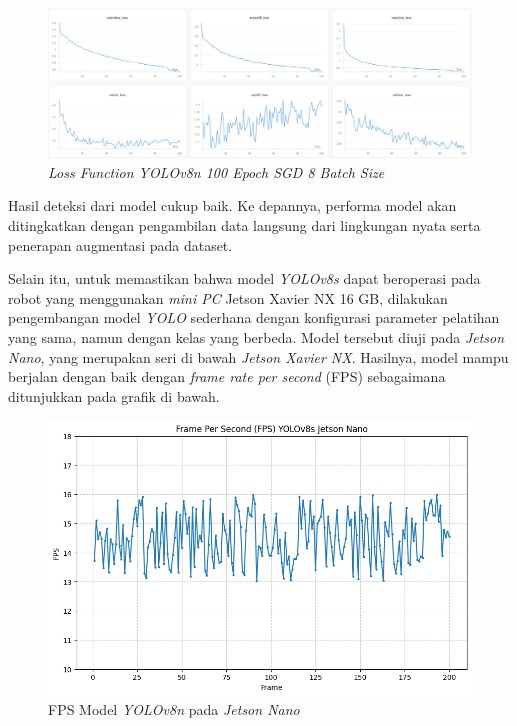 \begin{figure}[H] 
    \centering
    \includegraphics[scale=0.3]{gambar/lost_function.png}
    \caption{\emph{Loss Function YOLOv8n 100 Epoch SGD 8 Batch Size}}
    \label{fig:loss_function}
\end{figure}

Hasil deteksi dari model cukup baik. Ke depannya, performa model akan ditingkatkan dengan pengambilan data langsung dari lingkungan nyata serta penerapan augmentasi pada dataset.

Selain itu, untuk memastikan bahwa model \emph{YOLOv8s} dapat beroperasi pada robot yang menggunakan \emph{mini PC} Jetson Xavier NX 16 GB, dilakukan pengembangan model \emph{YOLO} sederhana dengan konfigurasi parameter pelatihan yang sama, namun dengan kelas yang berbeda. Model tersebut diuji pada \emph{Jetson Nano}, yang merupakan seri di bawah \emph{Jetson Xavier NX}. Hasilnya, model mampu berjalan dengan baik dengan \emph{frame rate per second} (FPS) sebagaimana ditunjukkan pada grafik di bawah.

\begin{figure}[H] 
    \centering
    \includegraphics[scale=0.5]{gambar/fps.png}
    \caption{FPS Model \emph{YOLOv8n} pada \emph{Jetson Nano}}
    \label{fig:FPS Model YOLOv8s pada Jetson Nano}
\end{figure}

